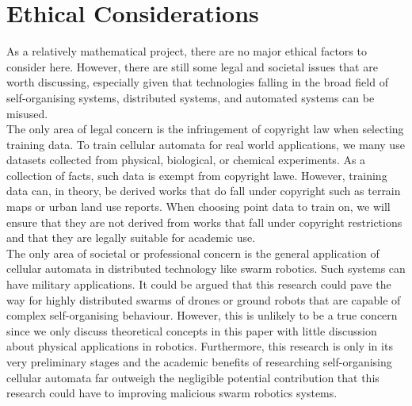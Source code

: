 \chapter{Ethical Considerations}

As a relatively mathematical project, there are no major ethical factors to consider here. However, there are still some legal and societal issues that are worth discussing, especially given that technologies falling in the broad field of self-organising systems, distributed systems, and automated systems can be misused.\\

The only area of legal concern is the infringement of copyright law when selecting training data. To train cellular automata for real world applications, we many use datasets collected from physical, biological, or chemical experiments. As a collection of facts, such data is exempt from copyright lawe. However, training data can, in theory, be derived works that do fall under copyright such as terrain maps or urban land use reports. When choosing point data to train on, we will ensure that they are not derived from works that fall under copyright restrictions and that they are legally suitable for academic use.\\

The only area of societal or professional concern is the general application of cellular automata in distributed technology like swarm robotics. Such systems can have military applications. It could be argued that this research could pave the way for highly distributed swarms of drones or ground robots that are capable of complex self-organising behaviour. However, this is unlikely to be a true concern since we only discuss theoretical concepts in this paper with little discussion about physical applications in robotics. Furthermore, this research is only in its very preliminary stages and the academic benefits of researching self-organising cellular automata far outweigh the negligible potential contribution that this research could have to improving malicious swarm robotics systems.\\

